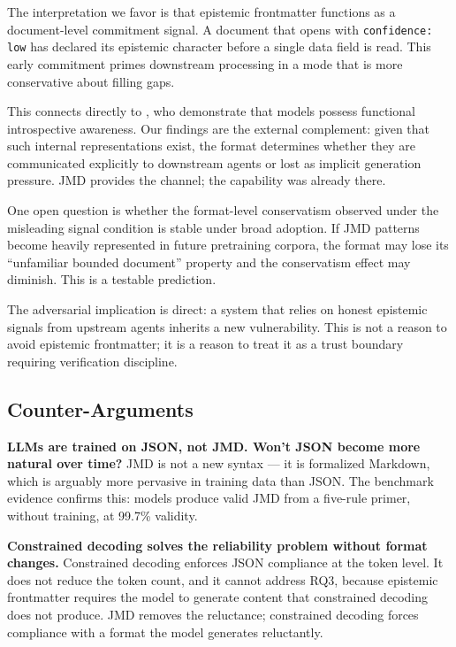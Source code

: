 \documentclass[11pt]{article}
\begin{document}
The interpretation we favor is that epistemic frontmatter functions as a document-level commitment signal. A document that opens with \texttt{confidence: low} has declared its epistemic character before a single data field is read. This early commitment primes downstream processing in a mode that is more conservative about filling gaps.

This connects directly to \cite{lindsey2025introspection}, who demonstrate that models possess functional introspective awareness. Our findings are the external complement: given that such internal representations exist, the format determines whether they are communicated explicitly to downstream agents or lost as implicit generation pressure. JMD provides the channel; the capability was already there.

One open question is whether the format-level conservatism observed under the misleading signal condition is stable under broad adoption. If JMD patterns become heavily represented in future pretraining corpora, the format may lose its ``unfamiliar bounded document'' property and the conservatism effect may diminish. This is a testable prediction.

The adversarial implication is direct: a system that relies on honest epistemic signals from upstream agents inherits a new vulnerability. This is not a reason to avoid epistemic frontmatter; it is a reason to treat it as a trust boundary requiring verification discipline.

\subsection{Counter-Arguments}

\textbf{LLMs are trained on JSON, not JMD. Won't JSON become more natural over time?}
JMD is not a new syntax --- it is formalized Markdown, which is arguably more pervasive in training data than JSON. The benchmark evidence confirms this: models produce valid JMD from a five-rule primer, without training, at 99.7\% validity.

\textbf{Constrained decoding solves the reliability problem without format changes.}
Constrained decoding enforces JSON compliance at the token level. It does not reduce the token count, and it cannot address RQ3, because epistemic frontmatter requires the model to generate content that constrained decoding does not produce. JMD removes the reluctance; constrained decoding forces compliance with a format the model generates reluctantly.
\end{document}
